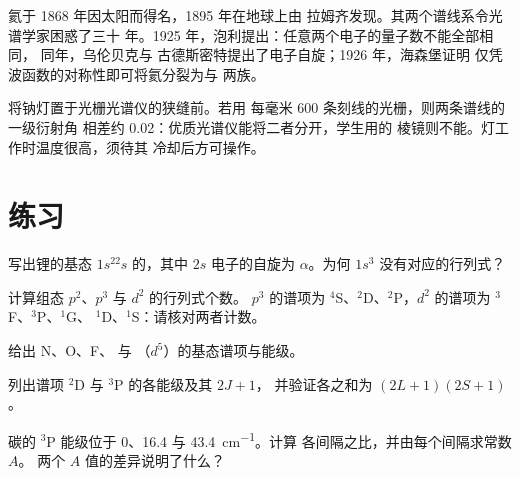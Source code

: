 \begin{history}[两种“氦”与不相容原理]
氦于 1868 年因太阳而得名，1895 年在地球上由
拉姆齐发现。其两个谱线系令光谱学家困惑了三十
年。1925 年，泡利提出：任意两个电子的量子数不能全部相同，
同年，乌伦贝克与
古德斯密特提出了电子自旋；1926 年，海森堡证明
仅凭波函数的对称性即可将氦分裂为与
两族。
\end{history}

\begin{inthelab}[分辨钠双线]
将钠灯置于光栅光谱仪的狭缝前。若用
每毫米 600 条刻线的光栅，则两条谱线的一级衍射角
相差约 \num{0.02}\textdegree：优质光谱仪能将二者分开，学生用的
棱镜则不能。灯工作时温度很高，须待其
冷却后方可操作。
\end{inthelab}

\section{练习}

\begin{exercise}[$\star$]\label{exo:b3:many-electron-atoms:1}
写出锂的基态 $1s^22s$ 的，其中
$2s$ 电子的自旋为 $\alpha$。为何
$1s^3$ 没有对应的行列式？
\end{exercise}

\begin{exercise}[$\star$]\label{exo:b3:many-electron-atoms:2}
计算组态 $p^2$、$p^3$ 与 $d^2$ 的行列式个数。
$p^3$ 的谱项为 ${}^4$S、${}^2$D、${}^2$P，$d^2$ 的谱项为 ${}^3$F、${}^3$P、${}^1$G、
${}^1$D、${}^1$S：请核对两者计数。
\end{exercise}

\begin{exercise}[$\star$]\label{exo:b3:many-electron-atoms:3}
给出 N、O、F、 与 （$d^5$）的基态谱项与能级。
\end{exercise}

\begin{exercise}[$\star$]\label{exo:b3:many-electron-atoms:4}
列出谱项 ${}^2$D 与 ${}^3$P 的各能级及其 $2J+1$，
并验证各之和为 $(2L+1)(2S+1)$。
\end{exercise}

\begin{exercise}[$\star\star$]\label{exo:b3:many-electron-atoms:5}
碳的 ${}^3$P 能级位于 0、16.4 与 \qty{43.4}{cm^{-1}}。计算
各间隔之比，并由每个间隔求常数 $A$。
两个 $A$ 值的差异说明了什么？
\end{exercise}

